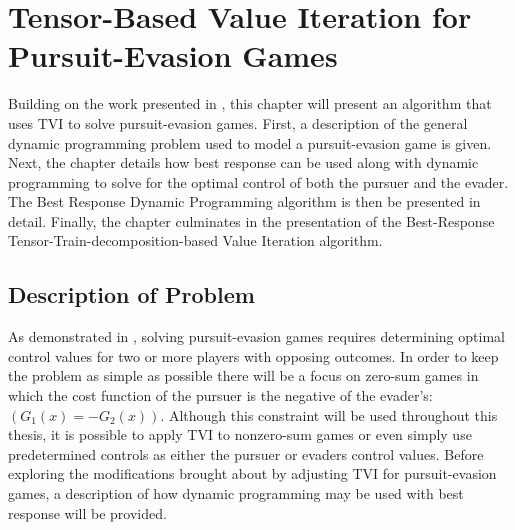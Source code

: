 \chapter{Tensor-Based Value Iteration for Pursuit-Evasion Games}\label{chp:tvipe}
Building on the work presented in , this chapter will present an algorithm that uses TVI to solve pursuit-evasion games. First, a description of the general dynamic programming problem used to model a pursuit-evasion game is given. Next, the chapter details how best response can be used along with dynamic programming to solve for the optimal control of both the pursuer and the evader. The Best Response Dynamic Programming algorithm is then be presented in detail. Finally, the chapter culminates in the presentation of the Best-Response Tensor-Train-decomposition-based Value Iteration algorithm.  

\section{Description of Problem}\label{peprobdes}
As demonstrated in , solving pursuit-evasion games requires determining optimal control values for two or more players with opposing outcomes. In order to keep the problem as simple as possible there will be a focus on zero-sum games in which the cost function of the pursuer is the negative of the evader's: $(G_1(x) = -G_2(x))$. Although this constraint will be used throughout this thesis, it is possible to apply TVI to nonzero-sum games or even simply use predetermined controls as either the pursuer or evaders control values. Before exploring the modifications brought about by adjusting TVI for pursuit-evasion games, a description of how dynamic programming may be used with best response will be provided.

